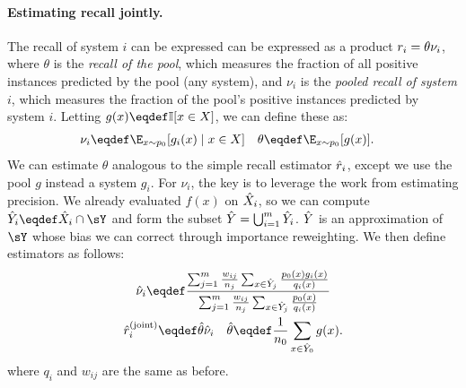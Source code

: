 \paragraph{Estimating recall jointly.}
The recall of system $i$ can be expressed can be expressed as a product $r_i = \theta \nu_i$,
where $\theta$ is the \emph{recall of the pool}, which measures the fraction of all positive instances predicted by the pool (any system),
and $\nu_i$ is the \emph{pooled recall of system $i$}, which measures the fraction of the pool's positive instances predicted by system $i$.
Letting $g(x) \eqdef \I[x \in X]$, we can define these as:
\begin{align*}
\nu_i &\eqdef \E_{x \sim p_0}[g_i(x) \mid x \in X] & \theta &\eqdef \E_{x \sim p_0}[g(x)].
\end{align*}
We can estimate $\theta$ analogous to the simple recall estimator ${\hat{r}}_i$,
except we use the pool $g$ instead a system $g_i$.
For $\nu_i$, the key is to leverage the work from estimating precision.
We already evaluated $f(x)$ on ${\hat{X}}_i$, so we can compute $\Yh_i \eqdef \Xh_i \intersection \sY$
and form the subset ${\hat{Y}} = \bigcup_{i=1}^m {\hat{Y}}_i$.
${\hat{Y}}$ is an approximation of $\sY$ whose bias we can correct through importance reweighting.
We then define estimators as follows:
\begin{gather*}
  \nuh_i \eqdef \frac{\sum_{j=1}^m \frac{w_{ij}}{n_j} \sum_{x \in \Yh_j} \frac{p_0(x) g_i(x)}{q_i(x)}}{\sum_{j=1}^m \frac{w_{ij}}{n_j} \sum_{x \in \Yh_j} \frac{p_0(x)}{q_i(x)}} \\
  \recallh_i^{\text{(joint)}} \eqdef \thetah\nuh_i \quad \thetah \eqdef \frac{1}{n_0} \sum_{x \in \Yh_0} g(x).
\end{gather*}
where $q_i$ and $w_{ij}$ are the same as before.


